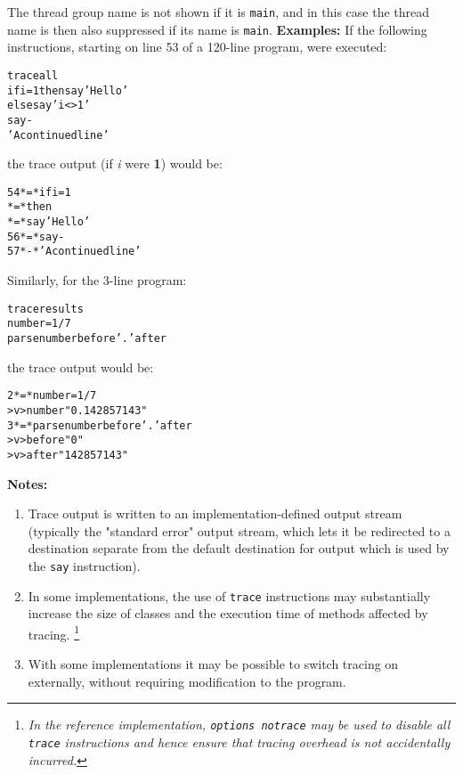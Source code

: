 The thread group name is not shown if it is \texttt{main}, and in this
case the thread name is then also suppressed if its name is \texttt{main}.
 \textbf{Examples:}
 If the following instructions, starting on line 53 of a 120-line
program, were executed:
\begin{alltt}
trace all
if i=1 then say 'Hello'
       else say 'i<>1'
say -
 'A continued line'
\end{alltt}
the trace output (if \emph{i} were \textbf{1}) would be:
\begin{alltt}
  54 *=* if i=1
     *=*        then
     *=*             say 'Hello'
  56 *=* say -
  57 *-*  'A continued line'
\end{alltt}
 Similarly, for the 3-line program:
\begin{alltt}
trace results
number=1/7
parse number before '.' after
\end{alltt}
the trace output would be:
\begin{alltt}
 2 *=* number=1/7
   >v> number "0.142857143"
 3 *=* parse number before '.' after
   >v> before "0"
   >v> after "142857143"
\end{alltt}
 \textbf{Notes:}
\begin{enumerate}
\item 
Trace output is written to an implementation-defined output stream
(typically the "standard error" output stream, which lets it be
redirected to a destination separate from the default destination for
output which is used by the \texttt{say} instruction).
\item In some implementations, the use of \texttt{trace} instructions
may substantially increase the size of classes and the execution time of
methods affected by tracing.
\footnote{
\emph{In the reference implementation, \texttt{options notrace} may be
used to disable all \texttt{trace} instructions and hence ensure that
tracing overhead is not accidentally incurred.}
}
\item With some implementations it may be possible to switch tracing on
externally, without requiring modification to the program.
\end{enumerate}
